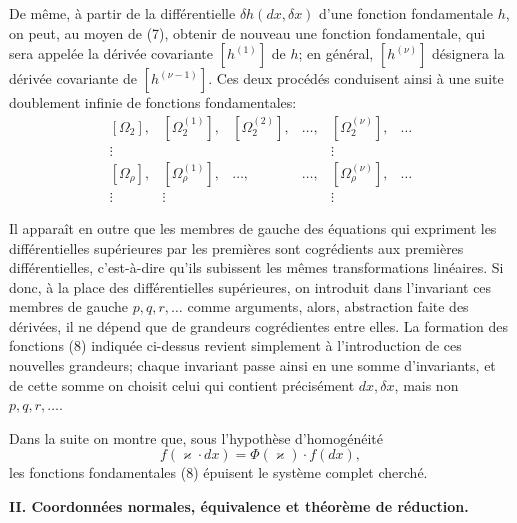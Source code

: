 De même, à partir de la différentielle \(\delta h(dx,\delta x)\) d'une
fonction fondamentale \(h\), on peut, au moyen de (7), obtenir de nouveau
une fonction fondamentale, qui sera appelée la \og{} dérivée covariante \fg{}
\([h^{(1)}]\) de \(h\); en général, \([h^{(\nu)}]\) désignera la dérivée
covariante de \([h^{(\nu-1)}]\). Ces deux procédés conduisent ainsi à
une suite doublement infinie de fonctions fondamentales:
\begin{equation}
\begin{array}{cccccc}
[\Omega_2], & [\Omega_2^{(1)}], & [\Omega_2^{(2)}], & \ldots,
& [\Omega_2^{(\nu)}], & \ldots\\
\vdots &&&& \vdots&\\
{}[\Omega_\rho], & [\Omega_\rho^{(1)}], & \ldots, & \ldots,
& [\Omega_\rho^{(\nu)}], & \ldots\\
\vdots & \vdots &&& \vdots&
\end{array}
\tag{8}
\end{equation}

Il apparaît en outre que les membres de gauche des équations qui expriment
les différentielles supérieures par les premières sont cogrédients aux
premières différentielles, c'est-à-dire qu'ils subissent les mêmes
transformations linéaires. Si donc, à la place des différentielles supérieures,
on introduit dans l'invariant ces membres de gauche \(p,q,r,\ldots\)
comme arguments, alors, abstraction faite des dérivées, il ne dépend que
de grandeurs cogrédientes entre elles. La formation des fonctions (8)
indiquée ci-dessus revient simplement à l'introduction de ces nouvelles
grandeurs; chaque invariant passe ainsi en une somme d'invariants, et de
cette somme on choisit celui qui contient précisément \(dx,\delta x\), mais
non \(p,q,r,\ldots\).

Dans la suite on montre que, sous l'hypothèse d'homogénéité
\[
f(\varkappa\cdot dx)=\Phi(\varkappa)\cdot f(dx),
\]
les fonctions fondamentales (8) épuisent le système complet cherché.

\begin{center}
\textbf{II. Coordonnées normales, équivalence et théorème de réduction.}
\end{center}

